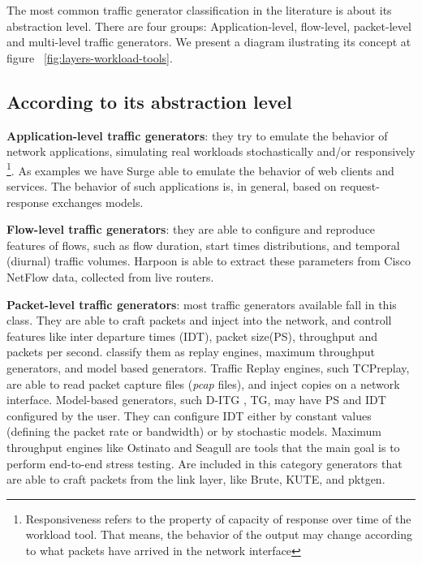 The most common traffic generator classification in the literature is about its abstraction level\cite{do-you-trust}. There are four groups: Application-level, flow-level, packet-level and multi-level traffic generators. We present a diagram  ilustrating its concept at figure ~\ref{fig:layers-workload-tools}.


\subsection{According to its abstraction level}

\textbf{Application-level traffic generators}: they try to emulate the behavior of network applications, simulating real workloads stochastically and/or responsively \footnote{Responsiveness refers to the property of capacity of response over time of the workload tool. That means, the behavior of the output may change according to what packets have arrived in the network interface}. As examples we have Surge\cite{surge-paper} able to emulate the behavior of web clients and services. The behavior of such applications is, in general, based on request-response exchanges models.

\textbf{Flow-level traffic generators}: they are able to configure and reproduce features of flows\cite{do-you-trust}\cite{sourcesonoff-paper}, such as flow duration, start times distributions, and temporal (diurnal) traffic volumes\cite{do-you-trust}. Harpoon \cite{harpoon-paper} is able to extract these parameters from Cisco NetFlow data, collected from live routers.

\textbf{Packet-level traffic generators}: most traffic generators available fall in this class. They are able to craft packets and inject into the network, and controll features like inter departure times (IDT), packet size(PS), throughput and packets per second\cite{validate-trafficgen}. \cite{validate-trafficgen} classify them as replay engines, maximum throughput generators, and model based generators. Traffic Replay engines, such TCPreplay\cite{web-tcpreplay}, are  able to read packet capture files (\textit{pcap} files), and inject copies on a network interface. Model-based generators, such D-ITG \cite{ditg-paper}, TG\cite{web-tg}, may have PS and IDT configured by the user. They can configure IDT  either by constant values (defining the packet rate or bandwidth) or by stochastic models. Maximum throughput engines like Ostinato and Seagull are tools that the main goal is to perform end-to-end stress testing. Are included in this category generators that are able to craft packets from the link layer, like Brute, KUTE, and pktgen.

